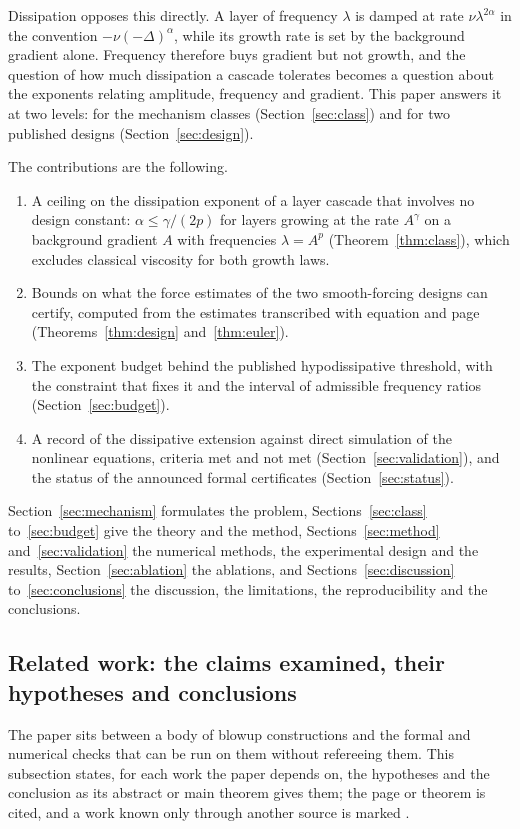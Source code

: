 \documentclass[11pt]{article}
\theoremstyle{remark}
\newcommand{\ev}[1]{\hspace{0.2em}{\small\textsf{[#1]}}}
\begin{document}
Dissipation opposes this directly. A layer of frequency $\lambda$ is damped at rate
$\nu\lambda^{2\alpha}$ in the convention $-\nu(-\Delta)^{\alpha}$, while its growth rate is set by the
background gradient alone. Frequency therefore buys gradient but not growth, and the question of how
much dissipation a cascade tolerates becomes a question about the exponents relating amplitude,
frequency and gradient. This paper answers it at two levels: for the mechanism classes
(Section~\ref{sec:class}) and for two published designs (Section~\ref{sec:design}).

The contributions are the following.
\begin{enumerate}
\item A ceiling on the dissipation exponent of a layer cascade that involves no design constant: $\alpha\le\gamma/(2p)$
for layers growing at the rate $A^{\gamma}$ on a background gradient $A$ with frequencies $\lambda=A^{p}$
(Theorem~\ref{thm:class}), which excludes classical viscosity for both growth laws.
\item Bounds on what the force estimates of the two smooth-forcing designs can certify, computed from the estimates
transcribed with equation and page (Theorems~\ref{thm:design} and~\ref{thm:euler}).
\item The exponent budget behind the published hypodissipative threshold, with the constraint that fixes it and the
interval of admissible frequency ratios (Section~\ref{sec:budget}).
\item A record of the dissipative extension against direct simulation of the nonlinear equations, criteria met and
not met (Section~\ref{sec:validation}), and the status of the announced formal certificates
(Section~\ref{sec:status}).
\end{enumerate}
Section~\ref{sec:mechanism} formulates the problem, Sections~\ref{sec:class} to~\ref{sec:budget} give the theory and
the method, Sections~\ref{sec:method} and~\ref{sec:validation} the numerical methods, the experimental design and the
results, Section~\ref{sec:ablation} the ablations, and Sections~\ref{sec:discussion} to~\ref{sec:conclusions} the
discussion, the limitations, the reproducibility and the conclusions.

\subsection{Related work: the claims examined, their hypotheses and conclusions}\label{sec:related}

The paper sits between a body of blowup constructions and the formal and numerical checks that can be
run on them without refereeing them. This subsection states, for each work the paper depends on, the
hypotheses and the conclusion as its abstract or main theorem gives them; the page or theorem is cited,
and a work known only through another source is marked \ev{U}.
\end{document}

